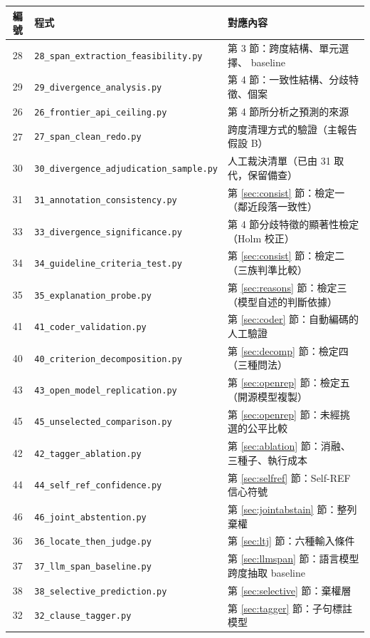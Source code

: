 \documentclass[11pt,a4paper]{ctexart}
\begin{document}
\begin{table}[h]
\centering\small
\begin{tabular}{@{}clp{7.2cm}@{}}
\toprule
編號 & 程式 & 對應內容 \\
\midrule
28 & \texttt{28\_span\_extraction\_feasibility.py} & 第 3 節：跨度結構、單元選擇、 baseline \\
29 & \texttt{29\_divergence\_analysis.py} & 第 4 節：一致性結構、分歧特徵、個案 \\
26 & \texttt{26\_frontier\_api\_ceiling.py} & 第 4 節所分析之預測的來源 \\
27 & \texttt{27\_span\_clean\_redo.py} & 跨度清理方式的驗證（主報告假設 B） \\
30 & \texttt{30\_divergence\_adjudication\_sample.py} & 人工裁決清單（已由 31 取代，保留備查） \\
31 & \texttt{31\_annotation\_consistency.py} & 第 \ref{sec:consist} 節：檢定一（鄰近段落一致性） \\
33 & \texttt{33\_divergence\_significance.py} & 第 4 節分歧特徵的顯著性檢定（Holm 校正） \\
34 & \texttt{34\_guideline\_criteria\_test.py} & 第 \ref{sec:consist} 節：檢定二（三族判準比較） \\
35 & \texttt{35\_explanation\_probe.py} & 第 \ref{sec:reasons} 節：檢定三（模型自述的判斷依據） \\
41 & \texttt{41\_coder\_validation.py} & 第 \ref{sec:coder} 節：自動編碼的人工驗證 \\
40 & \texttt{40\_criterion\_decomposition.py} & 第 \ref{sec:decomp} 節：檢定四（三種問法） \\
43 & \texttt{43\_open\_model\_replication.py} & 第 \ref{sec:openrep} 節：檢定五（開源模型複製） \\
45 & \texttt{45\_unselected\_comparison.py} & 第 \ref{sec:openrep} 節：未經挑選的公平比較 \\
42 & \texttt{42\_tagger\_ablation.py} & 第 \ref{sec:ablation} 節：消融、三種子、執行成本 \\
44 & \texttt{44\_self\_ref\_confidence.py} & 第 \ref{sec:selfref} 節：Self-REF 信心符號 \\
46 & \texttt{46\_joint\_abstention.py} & 第 \ref{sec:jointabstain} 節：整列棄權 \\
36 & \texttt{36\_locate\_then\_judge.py} & 第 \ref{sec:ltj} 節：六種輸入條件 \\
37 & \texttt{37\_llm\_span\_baseline.py} & 第 \ref{sec:llmspan} 節：語言模型跨度抽取 baseline \\
38 & \texttt{38\_selective\_prediction.py} & 第 \ref{sec:selective} 節：棄權層 \\
32 & \texttt{32\_clause\_tagger.py} & 第 \ref{sec:tagger} 節：子句標註模型 \\
\bottomrule
\end{tabular}
\end{table}
\end{document}
